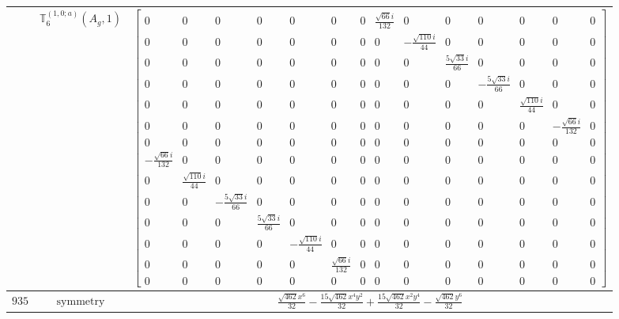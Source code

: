 \documentclass[fleqn,8pt,landscape]{jsarticle}
\begin{document}
\begin{longtable}{ccc}
$  $ & $ \mathbb{T}_{6}^{(1,0;a)}(A_{g},1) $ & $ \begin{bmatrix} 0 & 0 & 0 & 0 & 0 & 0 & 0 & \frac{\sqrt{66} i}{132} & 0 & 0 & 0 & 0 & 0 & 0 \\ 0 & 0 & 0 & 0 & 0 & 0 & 0 & 0 & - \frac{\sqrt{110} i}{44} & 0 & 0 & 0 & 0 & 0 \\ 0 & 0 & 0 & 0 & 0 & 0 & 0 & 0 & 0 & \frac{5 \sqrt{33} i}{66} & 0 & 0 & 0 & 0 \\ 0 & 0 & 0 & 0 & 0 & 0 & 0 & 0 & 0 & 0 & - \frac{5 \sqrt{33} i}{66} & 0 & 0 & 0 \\ 0 & 0 & 0 & 0 & 0 & 0 & 0 & 0 & 0 & 0 & 0 & \frac{\sqrt{110} i}{44} & 0 & 0 \\ 0 & 0 & 0 & 0 & 0 & 0 & 0 & 0 & 0 & 0 & 0 & 0 & - \frac{\sqrt{66} i}{132} & 0 \\ 0 & 0 & 0 & 0 & 0 & 0 & 0 & 0 & 0 & 0 & 0 & 0 & 0 & 0 \\ - \frac{\sqrt{66} i}{132} & 0 & 0 & 0 & 0 & 0 & 0 & 0 & 0 & 0 & 0 & 0 & 0 & 0 \\ 0 & \frac{\sqrt{110} i}{44} & 0 & 0 & 0 & 0 & 0 & 0 & 0 & 0 & 0 & 0 & 0 & 0 \\ 0 & 0 & - \frac{5 \sqrt{33} i}{66} & 0 & 0 & 0 & 0 & 0 & 0 & 0 & 0 & 0 & 0 & 0 \\ 0 & 0 & 0 & \frac{5 \sqrt{33} i}{66} & 0 & 0 & 0 & 0 & 0 & 0 & 0 & 0 & 0 & 0 \\ 0 & 0 & 0 & 0 & - \frac{\sqrt{110} i}{44} & 0 & 0 & 0 & 0 & 0 & 0 & 0 & 0 & 0 \\ 0 & 0 & 0 & 0 & 0 & \frac{\sqrt{66} i}{132} & 0 & 0 & 0 & 0 & 0 & 0 & 0 & 0 \\ 0 & 0 & 0 & 0 & 0 & 0 & 0 & 0 & 0 & 0 & 0 & 0 & 0 & 0 \end{bmatrix} $ \\ \hline
$ 935 $ & $ \text{symmetry} $ & $ \frac{\sqrt{462} x^{6}}{32} - \frac{15 \sqrt{462} x^{4} y^{2}}{32} + \frac{15 \sqrt{462} x^{2} y^{4}}{32} - \frac{\sqrt{462} y^{6}}{32} $ \\

\end{longtable}
\end{document}
